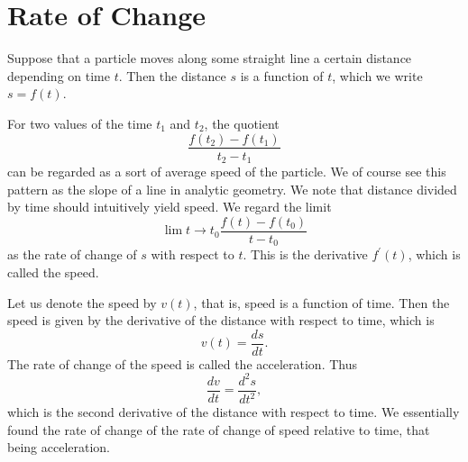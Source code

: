 \section*{Rate of Change}

Suppose that a particle moves along some straight line a certain distance depending on time $t$.
Then the distance $s$ is a function of $t$, which we write $s = f(t)$.

For two values of the time $t_1$ and $t_2$, the quotient
\[\frac{f(t_2) - f(t_1)}{t_2 - t_1}\]
can be regarded as a sort of average speed of the particle. We of course see this pattern as the slope of a line
in analytic geometry. We note that distance divided by time should intuitively yield speed. We regard the limit
\[\lim{t\to t_0} \frac{f(t) - f(t_0)}{t - t_0}\]
as the rate of change of $s$ with respect to $t$. This is the derivative $f^\prime(t)$, which is called the speed.

Let us denote the speed by $v(t)$, that is, speed is a function of time. Then the speed is given by the derivative
of the distance with respect to time, which is
\[v(t) = \frac{ds}{dt}.\]
The rate of change of the speed is called the acceleration. Thus
\[\frac{dv}{dt} = \frac{d^2s}{dt^2},\]
which is the second derivative of the distance with respect to time. We essentially found the rate of change of the
rate of change of speed relative to time, that being acceleration.
